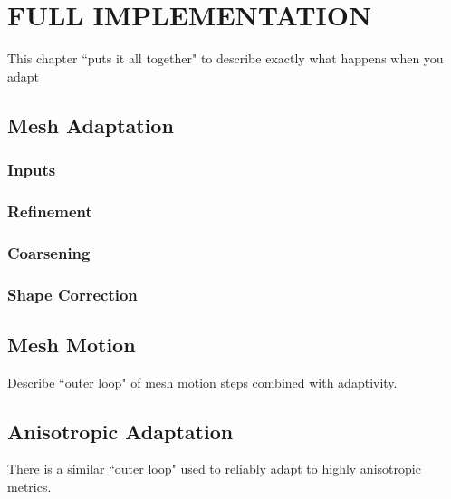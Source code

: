 
\chapter{FULL IMPLEMENTATION}

This chapter ``puts it all together" to describe
exactly what happens when you adapt

\section{Mesh Adaptation}

\subsection{Inputs}

\subsection{Refinement}

\subsection{Coarsening}

\subsection{Shape Correction}

\section{Mesh Motion}

Describe ``outer loop" of mesh motion steps
combined with adaptivity.

\section{Anisotropic Adaptation}

There is a similar ``outer loop" used to
reliably adapt to highly anisotropic metrics.



